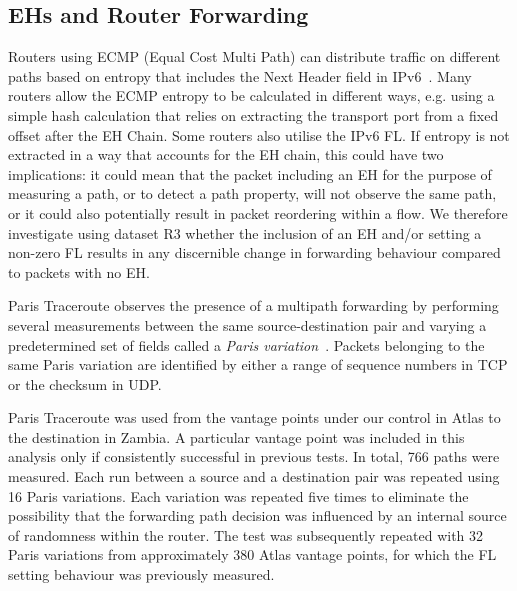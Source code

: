 \documentclass[conference]{IEEEtran}
\begin{document}
\subsection{EHs and Router Forwarding}

Routers using ECMP (Equal Cost Multi Path) can distribute traffic on different paths based on entropy that includes the Next Header field in
IPv6~\cite{lb-classification}. 
Many routers allow the ECMP entropy to be calculated in different ways,
e.g. using a simple hash calculation that relies on extracting the transport port from a fixed offset after the EH Chain. Some routers also utilise the IPv6 FL.
If entropy is not extracted in a way that accounts for the EH chain, this could have two implications: it could mean that the packet including an EH for the purpose of measuring a path, or to detect a path property, will not observe the same path, or it could also potentially result in packet reordering within a flow. 
We therefore investigate using dataset R3 whether the inclusion of an EH and/or setting a non-zero FL results in any discernible change in forwarding behaviour compared to packets with no EH.

% 


Paris Traceroute observes the presence of a multipath forwarding by 
performing several measurements between the same
source-destination pair and varying a predetermined set of fields called a
\textit{Paris variation}~\cite{augustin2006avoiding}.  Packets belonging to the
same Paris variation are identified by either a range of sequence numbers in
TCP or the checksum in UDP.


Paris Traceroute was used from the vantage points under our control in Atlas to
the destination in Zambia.  A  particular vantage point was included in this
analysis only if consistently successful in previous tests.  In total, 766
paths were measured.  Each run between a source and a destination pair was
repeated using 16 Paris variations.  Each variation was repeated five
times to eliminate the possibility that the forwarding path decision was
influenced by an internal source of randomness within the router. 
The test was subsequently repeated with 32 Paris variations from approximately 380 Atlas vantage points, for which the FL setting behaviour was previously measured.
\end{document}

